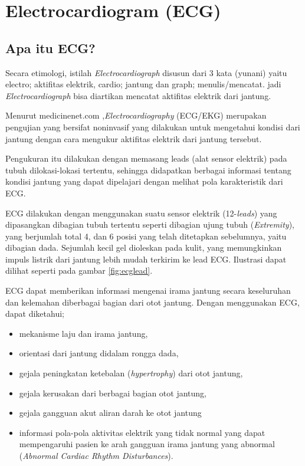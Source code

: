\section{Electrocardiogram (ECG)}
\label{sec:ecg}

\subsection{Apa itu ECG?}

Secara etimologi, istilah \textit{Electrocardiograph} disusun dari 3 kata
(yunani) yaitu electro; aktifitas elektrik, cardio; jantung dan graph;
menulis/mencatat. jadi \textit{Electrocardiograph} bisa diartikan mencatat
aktifitas elektrik dari jantung.

Menurut medicinenet.com \cite{medicinenet.1},\textit{Electrocardiography}
(ECG/EKG) merupakan pengujian yang bersifat noninvasif yang dilakukan untuk
mengetahui kondisi dari jantung dengan cara mengukur aktifitas elektrik dari
jantung tersebut.


Pengukuran itu dilakukan dengan memasang leads (alat sensor elektrik) pada
tubuh dilokasi-lokasi tertentu, sehingga didapatkan berbagai informasi tentang
kondisi jantung yang dapat dipelajari dengan melihat pola karakteristik dari
ECG.

ECG dilakukan dengan menggunakan suatu sensor elektrik (12-\textit{leads}) yang
dipasangkan dibagian tubuh tertentu seperti dibagian ujung tubuh 
(\textit{Extremity}), yang berjumlah total 4, dan 6 posisi yang telah ditetapkan
sebelumnya, yaitu dibagian dada. Sejumlah kecil gel dioleskan pada kulit, yang
memungkinkan impuls listrik dari jantung lebih mudah terkirim ke lead ECG.
Ilustrasi dapat dilihat seperti pada gambar \ref{fig:ecglead}. 

ECG dapat memberikan informasi mengenai irama jantung  secara keseluruhan dan
kelemahan diberbagai bagian dari otot jantung. Dengan menggunakan ECG, dapat
diketahui;

\begin{itemize}
   \item mekanisme laju dan irama jantung, 
   \item orientasi dari jantung didalam rongga dada, 
   \item gejala peningkatan ketebalan (\textit{hypertrophy}) dari otot jantung,
   \item gejala kerusakan dari berbagai bagian otot jantung, 
   \item gejala gangguan akut aliran darah ke otot jantung
   \item informasi pola-pola aktivitas elektrik yang tidak normal yang dapat
   mempengaruhi pasien ke arah gangguan irama jantung yang abnormal
   (\textit{Abnormal Cardiac Rhythm Disturbances}).
\end{itemize}

